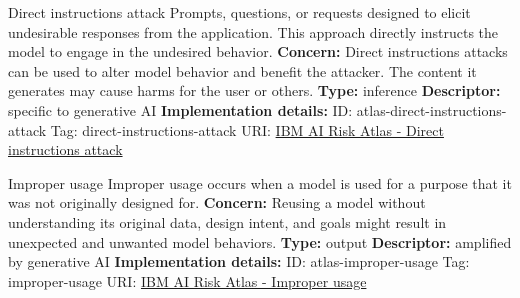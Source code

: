 \begin{definitionbox}{Direct instructions attack}
Prompts, questions, or requests designed to elicit undesirable responses from the application. This approach directly instructs the model to engage in the undesired behavior.\newline\newline
\textbf{Concern: }Direct instructions attacks can be used to alter model behavior and benefit the attacker. The content it generates may cause harms for the user or others.\newline\newline
\textbf{Type: }inference\newline
\textbf{Descriptor: }specific to generative AI \newline\newline
\textbf{Implementation details: } \newline
ID: atlas-direct-instructions-attack \newline
Tag: direct-instructions-attack \newline
URI:  \href{https://www.ibm.com/docs/en/watsonx/saas?topic=SSYOK8/wsj/ai-risk-atlas/direct-instructions-attack.html}{IBM AI Risk Atlas - Direct instructions attack}\newline
\end{definitionbox}
\begin{definitionbox}{Improper usage}
Improper usage occurs when a model is used for a purpose that it was not originally designed for.\newline\newline
\textbf{Concern: }Reusing a model without understanding its original data, design intent, and goals might result in unexpected and unwanted model behaviors.\newline\newline
\textbf{Type: }output\newline
\textbf{Descriptor: }amplified by generative AI \newline\newline
\textbf{Implementation details: } \newline
ID: atlas-improper-usage \newline
Tag: improper-usage \newline
URI:  \href{https://www.ibm.com/docs/en/watsonx/saas?topic=SSYOK8/wsj/ai-risk-atlas/improper-usage.html}{IBM AI Risk Atlas - Improper usage}\newline
\end{definitionbox}

